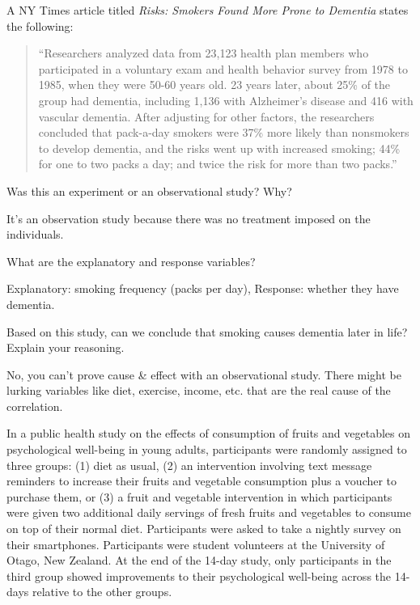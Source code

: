 \documentclass[12pt,answers]{exam}
\newcounter{countA}
\begin{document}
\begin{questions}
\setcounter{question}{\value{countA}}
\item A NY Times article titled \emph{Risks: Smokers Found More Prone to Dementia} states the following:

\begin{quote}
``Researchers analyzed data from 23,123 health plan members who
participated in a voluntary exam and health behavior survey from 1978 to
1985, when they were 50-60 years old. 23 years later, about 25\% of the
group had dementia, including 1,136 with Alzheimer's disease and 416
with vascular dementia. After adjusting for other factors, the
researchers concluded that pack-a-day smokers were 37\% more likely than
nonsmokers to develop dementia, and the risks went up with increased
smoking; 44\% for one to two packs a day; and twice the risk for more
than two packs.''
\end{quote}

\begin{parts}
\item
  Was this an experiment or an observational study? Why?
\begin{solution}
It's an observation study because there was no treatment imposed on the individuals. 
\end{solution}
\vfill
\item
  What are the explanatory and response variables?
\begin{solution}
Explanatory: smoking frequency (packs per day), Response: whether they have dementia.
\end{solution}
\vfill
\item
  Based on this study, can we conclude that smoking causes dementia
  later in life? Explain your reasoning.
\vfill
\begin{solution}
No, you can't prove cause \& effect with an observational study. There might be lurking variables like diet, exercise, income, etc. that are the real cause of the correlation. 
\end{solution}
\end{parts}


\question
  In a public health study on the effects of consumption of fruits and
  vegetables on psychological well-being in young adults, participants
  were randomly assigned to three groups: (1) diet as usual, (2) an
  intervention involving text message reminders to increase their fruits
  and vegetable consumption plus a voucher to purchase them, or (3) a
  fruit and vegetable intervention in which participants were given two
  additional daily servings of fresh fruits and vegetables to consume on
  top of their normal diet. Participants were asked to take a nightly
  survey on their smartphones. Participants were student volunteers at
  the University of Otago, New Zealand. At the end of the 14-day study,
  only participants in the third group showed improvements to their
  psychological well-being across the 14-days relative to the other
  groups.


\end{questions}
\end{document}

